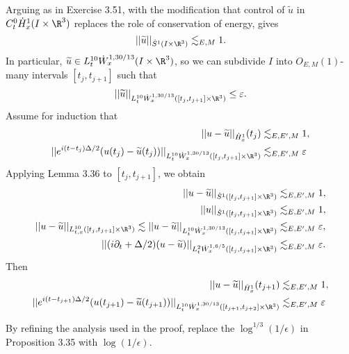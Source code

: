 \begin{solution}
	Arguing as in Exercise 3.51, with the modification that control of $\widetilde u$ in $C^0_t \dot H^1_x (I \times \R^3)$ replaces the role of conservation of energy, gives
		\[ ||\widetilde u||_{\dot S^1 (I \times \R^3)} \lesssim_{E, M} 1. \]
	In particular, $\widetilde u \in L^{10}_t \dot W^{1, 30/13}_x (I \times \R^3)$, so we can subdivide $I$ into $O_{E, M} (1)$-many intervals $[t_j, t_{j + 1}]$ such that 
		\[ ||\widetilde u||_{L^{10}_t \dot W^{1, 30/13}_x ([t_j, t_{j + 1}] \times \R^3)} \leq \epsilon. \]
	Assume for induction that 
		\begin{align*}
			||u - \widetilde u||_{\dot H^1_x} (t_j)
				&\lesssim_{E, E', M} 1, \\
						 ||e^{i (t - t_j) \Delta/2} (u(t_j) - \widetilde u(t_j)) ||_{L^{10}_t \dot W^{1, 30/13}_x ([t_j, t_{j +1}] \times \R^3)}
				&\lesssim_{E, E', M} \epsilon
		\end{align*}	 
	Applying Lemma 3.36 to $[t_j, t_{j + 1}]$, we obtain
	\begin{align*}
		||u - \widetilde u||_{\dot S^1 ([t_j, t_{j + 1}] \times \R^3)} 
			&\lesssim_{E, E', M} 1,\\
		||u||_{\dot S^1 ([t_j, t_{j + 1}] \times \R^3)}
			&\lesssim_{E, E', M} 1,\\
		||u - \widetilde u||_{L^{10}_{t, x} ( [t_j, t_{j + 1}]\times \R^3)} \lesssim ||u - \widetilde u||_{L^{10}_t \dot W^{1, 30/13}_{x} ([t_j, t_{j + 1}] \times \R^3)}
			&\lesssim_{E, E', M} \epsilon, \\
		||(i \partial_t + \Delta/2) (u - \widetilde u)||_{L^2_t \dot W^{1, 6/5}_x ( [t_j, t_{j + 1}] \times \R^3)}
			&\lesssim_{E, E', M} \epsilon. 	
	\end{align*}	
	Then	
	\begin{align*}
			||u - \widetilde u||_{\dot H^1_x} (t_{j + 1})
				&\lesssim_{E, E', M} 1, \\
						 ||e^{i (t - t_{j + 1}) \Delta/2} (u(t_{j + 1}) - \widetilde u(t_{j + 1})) ||_{L^{10}_t \dot W^{1, 30/13}_x ([t_{j + 1}, t_{j +2}] \times \R^3)}
				&\lesssim_{E, E', M} \epsilon
		\end{align*}	 
\end{solution}

\begin{statement}
	By refining the analysis used in the proof, replace the $\log^{1/3} (1/\epsilon)$ in Proposition 3.35 with $\log (1/\epsilon)$. 
\end{statement}

